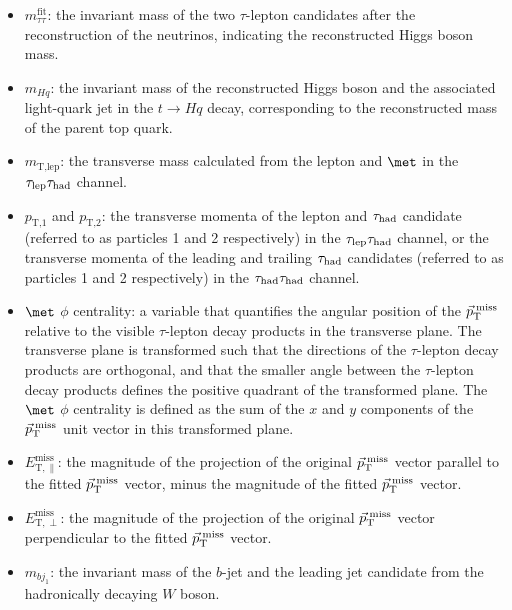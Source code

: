 \begin{itemize}
\item $m_{\tau\tau}^{\text{fit}}$: the invariant mass of the two $\tau$-lepton candidates after the reconstruction of the neutrinos, indicating the reconstructed Higgs boson mass.
\item $m_{Hq}$: the invariant mass of the reconstructed Higgs boson and the associated light-quark jet in the $t \to Hq$ decay, corresponding to the reconstructed mass of the parent top quark.
\item $m_{\text{T,lep}}$: the transverse mass calculated from the lepton and $\met$ in the $\tau_{\mathrm{lep}} \tau_{\mathrm{had}}$ channel.
\item $p_{\text{T,1}}$ and $p_{\text{T,2}}$:  the transverse momenta of the lepton and $\tau_{\mathrm{had}}$ candidate (referred to as particles 1 and 2 respectively) in the $\tau_{\mathrm{lep}} \tau_{\mathrm{had}}$ channel, or the transverse momenta of the leading and trailing $\tau_{\mathrm{had}}$ candidates (referred to as particles 1 and 2 respectively) in the $\tau_{\mathrm{had}} \tau_{\mathrm{had}}$ channel.
\item $\met$ $\phi$ centrality: a variable that quantifies the angular position of the $\vec{p}_\textrm{T}^\textrm{\;miss}$ relative to the 
visible $\tau$-lepton decay products in the transverse plane. The transverse plane is transformed such that the directions of the $\tau$-lepton decay products are 
orthogonal, and that the smaller angle between the $\tau$-lepton decay products defines the positive quadrant of the transformed plane. 
The $\met$ $\phi$ centrality is defined as the sum of the $x$ and $y$ components of the $\vec{p}_\textrm{T}^\textrm{\;miss}$ unit vector in this transformed plane.
\item $E_{\text{T},\parallel}^{\text{miss}}$: the magnitude of the projection of the original $\vec{p}_\textrm{T}^\textrm{\;miss}$ vector parallel to the fitted $\vec{p}_\textrm{T}^\textrm{\;miss}$ vector, minus 
the magnitude of the fitted $\vec{p}_\textrm{T}^\textrm{\;miss}$ vector.
\item $E_{\text{T},\perp}^{\text{miss}}$: the magnitude of the projection of the original $\vec{p}_\textrm{T}^\textrm{\;miss}$ vector perpendicular to the fitted $\vec{p}_\textrm{T}^\textrm{\;miss}$ vector.
\item $m_{b j_1}$: the invariant mass of the $b$-jet and the leading jet candidate from the hadronically decaying $W$ boson.

\end{itemize}
